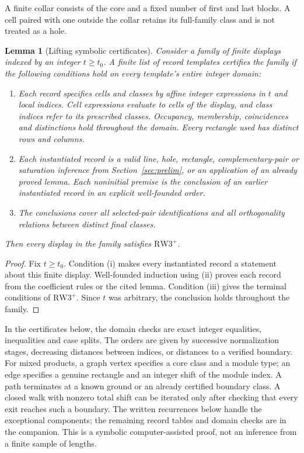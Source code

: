 \documentclass[11pt,a4paper]{article}
\newtheorem{lemma}[theorem]{Lemma}
\theoremstyle{definition}
\newcommand{\RW}{\mathrm{RW3}^{+}}
\begin{document}
A finite collar consists of the core and a fixed number of first and
last blocks. A cell paired with one outside the collar retains its
full-family class and is not treated as a hole.

\begin{lemma}[Lifting symbolic certificates]\label{lem:certificate-lifting}
Consider a family of finite displays indexed by an integer $t\ge t_0$.
A finite list of record templates certifies the family if the following
conditions hold on every template's entire integer domain:
\begin{enumerate}[label=(\roman*)]
\item Each record specifies cells and classes by affine integer
expressions in $t$ and local indices. Cell expressions evaluate to cells of the display, and class indices
refer to its prescribed classes. Occupancy, membership, coincidences and
distinctions hold throughout the domain. Every rectangle used has distinct rows and columns.
\item Each instantiated record is a valid line, hole, rectangle,
complementary-pair or saturation inference from Section~\ref{sec:prelim},
or an application of an already
proved lemma. Each noninitial premise is the conclusion of an earlier instantiated
record in an explicit well-founded order.
\item The conclusions cover all selected-pair identifications and
all orthogonality relations between distinct final classes.
\end{enumerate}
Then every display in the family satisfies $\RW$.
\end{lemma}
\begin{proof}
Fix $t\ge t_0$. Condition (i) makes every instantiated record a statement
about this finite display. Well-founded induction using (ii) proves each
record from the coefficient rules or the cited lemma. Condition (iii)
gives the terminal conditions of $\RW$. Since $t$ was arbitrary, the conclusion holds throughout the family.
\end{proof}

In the certificates below, the domain checks are exact integer equalities,
inequalities and case splits. The orders are given by successive
normalization stages, decreasing distances between indices, or distances
to a verified boundary. For mixed products, a graph vertex specifies a
core class and a module type; an edge specifies a genuine rectangle and
an integer shift of the module index. A path terminates at a known ground
or an already certified boundary class. A closed walk with nonzero total
shift can be iterated only after checking that every exit reaches such a
boundary. The written recurrences below handle the exceptional
components; the remaining record tables and domain checks are in the
companion. This is a symbolic computer-assisted proof, not an inference
from a finite sample of lengths.
\end{document}
